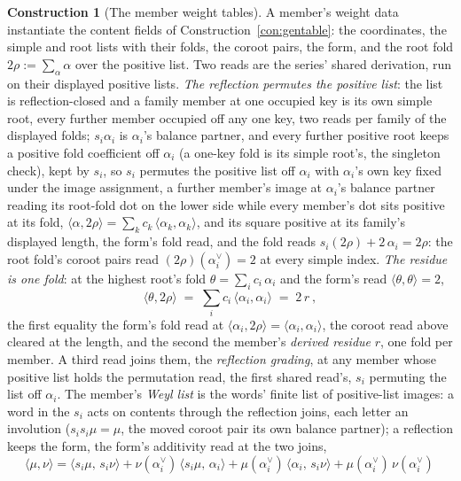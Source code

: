 \documentclass[11pt]{article}
\theoremstyle{definition}
\newtheorem{construction}{Construction}
\begin{document}
\begin{construction}[The member weight tables]\label{con:sertables}
A member's weight data instantiate the content fields of
Construction~\ref{con:gentable}: the coordinates, the simple and
root lists with their folds, the coroot pairs, the form, and the
root fold $2\rho:=\sum_\alpha\alpha$ over the positive list. Two
reads are the series' shared derivation, run on their displayed
positive lists. \emph{The
reflection permutes the positive list}: the list is
reflection-closed and a family member at one occupied key is its
own simple root, every further member occupied off any one key,
two reads per family of the displayed folds; $s_i\alpha_i$ is $\alpha_i$'s
balance partner, and every further positive root keeps a positive
fold coefficient off $\alpha_i$ (a one-key fold is its simple
root's, the singleton check), kept by $s_i$, so $s_i$ permutes
the positive list off $\alpha_i$ with $\alpha_i$'s own key fixed
under the image assignment, a further member's image at
$\alpha_i$'s balance partner reading its root-fold dot on the
lower side while every member's dot sits positive at its fold,
$\langle\alpha,2\rho\rangle=\sum_kc_k\,\langle\alpha_k,\alpha_k
\rangle$, and its square positive at its family's displayed
length, the form's fold read, and the fold reads
$s_i(2\rho)+2\,\alpha_i=2\rho$: the root fold's coroot pairs read
$(2\rho)(\alpha_i^\vee)=2$ at every simple index. \emph{The
residue is one fold}: at the highest root's fold
$\theta=\sum_ic_i\,\alpha_i$ and the form's read
$\langle\theta,\theta\rangle=2$,
\[
\langle\theta,2\rho\rangle\;=\;\sum_i c_i\,
\langle\alpha_i,\alpha_i\rangle\;=\;2\,r\ ,
\]
the first equality the form's fold read at
$\langle\alpha_i,2\rho\rangle=\langle\alpha_i,\alpha_i\rangle$,
the coroot read above cleared at the length, and the second the
member's \emph{derived residue} $r$, one fold per member. A third
read joins them, the \emph{reflection grading}, at any member
whose positive list holds the permutation read, the first shared
read's, $s_i$ permuting the list off $\alpha_i$. The member's
\emph{Weyl list} is the words' finite list of positive-list
images: a word in the $s_i$ acts on contents through the
reflection joins, each letter an involution ($s_is_i\mu=\mu$,
the moved coroot pair its own balance partner); a reflection
keeps the form, the form's additivity read at the two joins,
\[
\langle\mu,\nu\rangle
=\langle s_i\mu,\,s_i\nu\rangle
+\nu(\alpha_i^\vee)\,\langle s_i\mu,\,\alpha_i\rangle
+\mu(\alpha_i^\vee)\,\langle\alpha_i,\,s_i\nu\rangle
+\mu(\alpha_i^\vee)\,\nu(\alpha_i^\vee)\,
\]
\end{construction}
\end{document}
